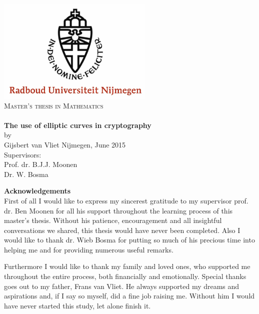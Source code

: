\documentclass{article}
\numberwithin{equation}{section}
\theoremstyle{definition}
\begin{document}
\begin{titlepage}
\begin{center}

\includegraphics[width5cm, height=5cm]{unilogo}
\\[1cm]
\textsc{\large Master's thesis in Mathematics} \\[0.5cm]
\hline \\[0.8cm]

{\LARGE \textbf{The use of elliptic curves in cryptography}}\\[0.5cm]
by\\[0.2cm]
{\large Gijsbert van Vliet}
\vfill
{\large Nijmegen, June 2015}\\[2cm]
{\large Supervisors:}\\[0.2cm]
{\large Prof. dr. B.J.J. Moonen}\\
{\large Dr. W. Bosma}
\end{center}
\end{titlepage}
\null\thispagestyle{empty}\newpage

{\LARGE \textbf{Acknowledgements}}\\[1cm]
First of all I would like to express my sincerest gratitude to my supervisor prof. dr. Ben Moonen for all his support throughout the learning process of this master's thesis. Without his patience, encouragement and all insightful conversations we shared, this thesis would have never been completed. Also I would like to thank dr. Wieb Bosma for putting so much of his precious time into helping me and for providing numerous useful remarks. \par 
Furthermore I would like to thank my family and loved ones, who supported me throughout the entire process, both financially and emotionally. Special thanks goes out to my father, Frans van Vliet. He always supported my dreams and aspirations and, if I say so myself, did a fine job raising me. Without him I would have never started this study, let alone finish it. 

\newpage
\tableofcontents
\newpage
\end{document}
